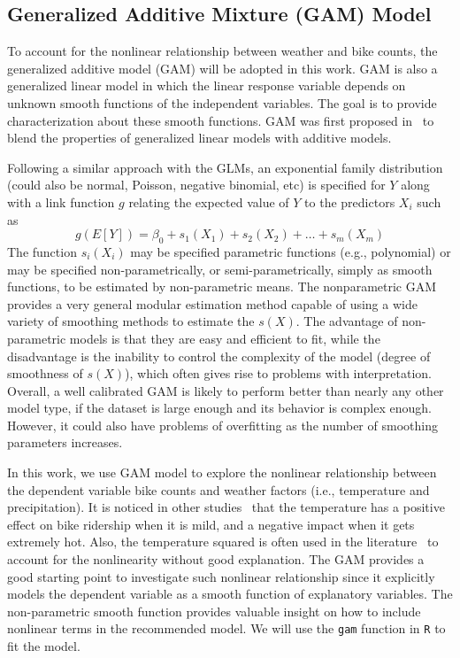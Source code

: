\documentclass [11pt, proquest] {uwthesis}[2015/03/03]
\begin{document}
\subsection{Generalized Additive Mixture (GAM) Model}
\label{sec:gamintro}

To account for the nonlinear relationship between weather and bike counts, the generalized additive model (GAM) will be adopted in this work. GAM is also a generalized linear model in which the linear response variable depends on unknown smooth functions of the independent variables. The goal is to provide characterization about these smooth functions. GAM was first proposed in~\cite{Hastie86} to blend the properties of generalized linear models with additive models. 

Following a similar approach with the GLMs, an exponential family distribution (could also be normal, Poisson, negative binomial, etc) is specified for $Y$ along with a link function $g$ relating the expected value of $Y$ to the predictors $X_i$ such as
\begin{equation*}
g(E[Y]) = \beta_0 + s_1(X_1) + s_2(X_2) + \hdots + s_m(X_m)
\end{equation*}
The function $s_i(X_i)$ may be specified parametric functions (e.g., polynomial) or may be specified non-parametrically, or semi-parametrically, simply as smooth functions, to be estimated by non-parametric means. The nonparametric GAM provides a very general modular estimation method capable of using a wide variety of smoothing methods to estimate the $s(X)$. The advantage of non-parametric models is that they are easy and efficient to fit, while the disadvantage is the inability to control the complexity of the model (degree of smoothness of $s(X)$), which often gives rise to problems with interpretation. Overall, a well calibrated GAM is likely to perform better than nearly any other model type, if the dataset is large enough and its behavior is complex enough. However, it could also have problems of overfitting as the number of smoothing parameters increases. 

In this work, we use GAM model to explore the nonlinear relationship between the dependent variable bike counts and weather factors (i.e., temperature and precipitation). It is noticed in other studies~\cite{Rose07} that the temperature has a positive effect on bike ridership when it is mild, and a negative impact when it gets extremely hot. Also, the temperature squared is often used in the literature~\cite{Richardson:2000aa} to account for the nonlinearity without good explanation. The GAM provides a good starting point to investigate such nonlinear relationship since it explicitly models the dependent variable as a smooth function of explanatory variables. The non-parametric smooth function provides valuable insight on how to include nonlinear terms in the recommended model. We will use the \texttt{gam} function in \texttt{R} to fit the model.
\end{document}
